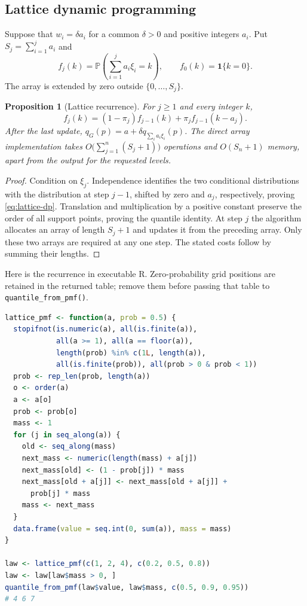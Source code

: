 \documentclass[11pt,letterpaper]{article}
\numberwithin{equation}{section}
\newtheorem{proposition}[theorem]{Proposition}
\theoremstyle{definition}
\theoremstyle{remark}
\begin{document}
\subsection{Lattice dynamic programming}

Suppose that $w_i=\delta a_i$ for a common $\delta>0$ and positive
integers $a_i$.  Put $S_j=\sum_{i=1}^j a_i$ and
\[
 f_j(k)=\mathbb P\!\left(\sum_{i=1}^j a_i\xi_i=k\right),
 \qquad f_0(k)=\mathbf 1\{k=0\}.
\]
The array is extended by zero outside $\{0,\ldots,S_j\}$.

\begin{proposition}[Lattice recurrence]
\label{prop:lattice-dp}
For $j\ge1$ and every integer $k$,
\begin{equation}
 f_j(k)=(1-\pi_j)f_{j-1}(k)+\pi_j f_{j-1}(k-a_j).
 \label{eq:lattice-dp}
\end{equation}
After the last update,
$q_G(p)=a+\delta q_{\sum_i a_i\xi_i}(p)$.
The direct array implementation takes
$O\bigl(\sum_{j=1}^n(S_j+1)\bigr)$ operations and $O(S_n+1)$ memory,
apart from the output for the requested levels.
\end{proposition}

\begin{proof}
Condition on $\xi_j$.  Independence identifies the two conditional
distributions with the distribution at step $j-1$, shifted by zero and
$a_j$, respectively, proving \eqref{eq:lattice-dp}.  Translation and
multiplication by a positive constant preserve the order of all support
points, proving the quantile identity.  At step $j$ the algorithm
allocates an array of length $S_j+1$ and updates it from the preceding
array.  Only these two arrays are required at any one step.  The stated
costs follow by summing their lengths.
\end{proof}

Here is the recurrence in executable R.  Zero-probability grid positions
are retained in the returned table; remove them before passing that table
to \texttt{quantile\_from\_pmf()}.
\begin{lstlisting}[language=R]
lattice_pmf <- function(a, prob = 0.5) {
  stopifnot(is.numeric(a), all(is.finite(a)),
            all(a >= 1), all(a == floor(a)),
            length(prob) %in% c(1L, length(a)),
            all(is.finite(prob)), all(prob > 0 & prob < 1))
  prob <- rep_len(prob, length(a))
  o <- order(a)
  a <- a[o]
  prob <- prob[o]
  mass <- 1
  for (j in seq_along(a)) {
    old <- seq_along(mass)
    next_mass <- numeric(length(mass) + a[j])
    next_mass[old] <- (1 - prob[j]) * mass
    next_mass[old + a[j]] <- next_mass[old + a[j]] +
      prob[j] * mass
    mass <- next_mass
  }
  data.frame(value = seq.int(0, sum(a)), mass = mass)
}

law <- lattice_pmf(c(1, 2, 4), c(0.2, 0.5, 0.8))
law <- law[law$mass > 0, ]
quantile_from_pmf(law$value, law$mass, c(0.5, 0.9, 0.95))
# 4 6 7
\end{lstlisting}
\end{document}
